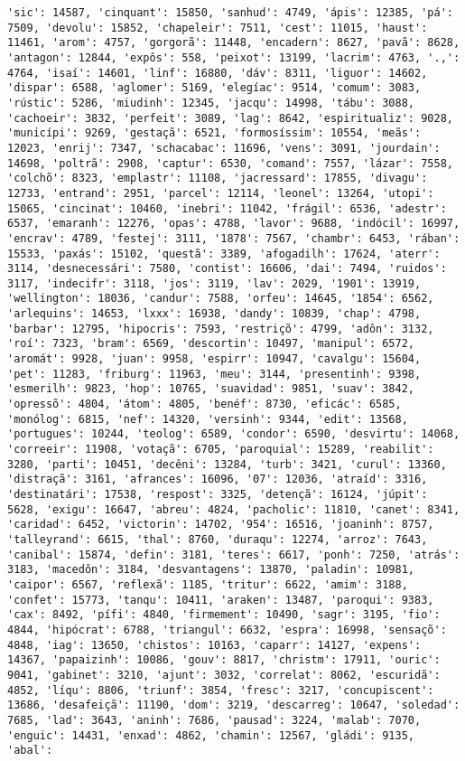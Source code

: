\begin{Verbatim}[commandchars=\\\{\}]
'sic': 14587, 'cinquant': 15850, 'sanhud': 4749, 'ápis': 12385, 'pá': 7509, 'devolu': 15852, 'chapeleir': 7511, 'cest': 11015, 'haust': 11461, 'arom': 4757, 'gorgorã': 11448, 'encadern': 8627, 'pavã': 8628, 'antagon': 12844, 'expôs': 558, 'peixot': 13199, 'lacrim': 4763, '.,': 4764, 'isaí': 14601, 'linf': 16880, 'dáv': 8311, 'liguor': 14602, 'dispar': 6588, 'aglomer': 5169, 'elegíac': 9514, 'comum': 3083, 'rústic': 5286, 'miudinh': 12345, 'jacqu': 14998, 'tábu': 3088, 'cachoeir': 3832, 'perfeit': 3089, 'lag': 8642, 'espiritualiz': 9028, 'municípi': 9269, 'gestaçã': 6521, 'formosíssim': 10554, 'meãs': 12023, 'enrij': 7347, 'schacabac': 11696, 'vens': 3091, 'jourdain': 14698, 'poltrã': 2908, 'captur': 6530, 'comand': 7557, 'lázar': 7558, 'colchõ': 8323, 'emplastr': 11108, 'jacressard': 17855, 'divagu': 12733, 'entrand': 2951, 'parcel': 12114, 'leonel': 13264, 'utopi': 15065, 'cincinat': 10460, 'inebri': 11042, 'frágil': 6536, 'adestr': 6537, 'emaranh': 12276, 'opas': 4788, 'lavor': 9688, 'indócil': 16997, 'encrav': 4789, 'festej': 3111, '1878': 7567, 'chambr': 6453, 'rában': 15533, 'paxás': 15102, 'questã': 3389, 'afogadilh': 17624, 'aterr': 3114, 'desnecessári': 7580, 'contist': 16606, 'dai': 7494, 'ruidos': 3117, 'indecifr': 3118, 'jos': 3119, 'lav': 2029, '1901': 13919, 'wellington': 18036, 'candur': 7588, 'orfeu': 14645, '1854': 6562, 'arlequins': 14653, 'lxxx': 16938, 'dandy': 10839, 'chap': 4798, 'barbar': 12795, 'hipocris': 7593, 'restriçõ': 4799, 'adôn': 3132, 'roí': 7323, 'bram': 6569, 'descortin': 10497, 'manipul': 6572, 'aromát': 9928, 'juan': 9958, 'espirr': 10947, 'cavalgu': 15604, 'pet': 11283, 'friburg': 11963, 'meu': 3144, 'presentinh': 9398, 'esmerilh': 9823, 'hop': 10765, 'suavidad': 9851, 'suav': 3842, 'opressõ': 4804, 'átom': 4805, 'benéf': 8730, 'eficác': 6585, 'monólog': 6815, 'nef': 14320, 'versinh': 9344, 'edit': 13568, 'portugues': 10244, 'teolog': 6589, 'condor': 6590, 'desvirtu': 14068, 'correeir': 11908, 'votaçã': 6705, 'paroquial': 15289, 'reabilit': 3280, 'parti': 10451, 'decêni': 13284, 'turb': 3421, 'curul': 13360, 'distraçã': 3161, 'afrances': 16096, '07': 12036, 'atraíd': 3316, 'destinatári': 17538, 'respost': 3325, 'detençã': 16124, 'júpit': 5628, 'exigu': 16647, 'abreu': 4824, 'pacholic': 11810, 'canet': 8341, 'caridad': 6452, 'victorin': 14702, '954': 16516, 'joaninh': 8757, 'talleyrand': 6615, 'thal': 8760, 'duraqu': 12274, 'arroz': 7643, 'canibal': 15874, 'defin': 3181, 'teres': 6617, 'ponh': 7250, 'atrás': 3183, 'macedôn': 3184, 'desvantagens': 13870, 'paladin': 10981, 'caipor': 6567, 'reflexã': 1185, 'tritur': 6622, 'amim': 3188, 'confet': 15773, 'tanqu': 10411, 'araken': 13487, 'paroqui': 9383, 'cax': 8492, 'pífi': 4840, 'firmement': 10490, 'sagr': 3195, 'fio': 4844, 'hipócrat': 6788, 'triangul': 6632, 'espra': 16998, 'sensaçõ': 4848, 'iag': 13650, 'chistos': 10163, 'caparr': 14127, 'expens': 14367, 'papaizinh': 10086, 'gouv': 8817, 'christm': 17911, 'ouric': 9041, 'gabinet': 3210, 'ajunt': 3032, 'correlat': 8062, 'escuridã': 4852, 'líqu': 8806, 'triunf': 3854, 'fresc': 3217, 'concupiscent': 13686, 'desafeiçã': 11190, 'dom': 3219, 'descarreg': 10647, 'soledad': 7685, 'lad': 3643, 'aninh': 7686, 'pausad': 3224, 'malab': 7070, 'enguic': 14431, 'enxad': 4862, 'chamin': 12567, 'gládi': 9135, 'abal': 
\end{Verbatim}
